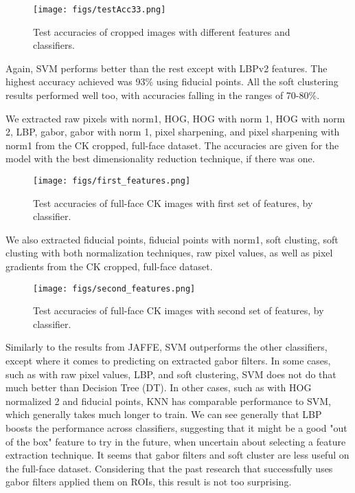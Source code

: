 \documentclass[10pt,twocolumn,letterpaper]{article}
\begin{document}
\begin{figure}[h]
\texttt{[image: figs/testAcc33.png]}
\caption{Test accuracies of cropped images with different features and classifiers.}
\label{fig:testacc3}
\end{figure}

Again, SVM performs better than the rest except with LBPv2 features. The highest accuracy achieved was 93\% using fiducial points. All the soft clustering results performed well too, with accuracies falling in the ranges of 70-80\%.

We extracted raw pixels with norm1, HOG, HOG with norm 1, HOG with norm 2, LBP, gabor, gabor with norm 1, pixel sharpening, and pixel sharpening with norm1 from the CK cropped, full-face dataset. The accuracies are given for the model with the best dimensionality reduction technique, if there was one.

\begin{figure}[h]
\texttt{[image: figs/first\_features.png]}
\caption{Test accuracies of full-face CK images with first set of features, by classifier.}
\label{fig:testck1}
\end{figure}

We also extracted fiducial points, fiducial points with norm1, soft clusting, soft clusting with both normalization techniques, raw pixel values, as well as pixel gradients from the CK cropped, full-face dataset.

\begin{figure}[h]
\texttt{[image: figs/second\_features.png]}
\caption{Test accuracies of full-face CK images with second set of features, by classifier.}
\label{fig:testck2}
\end{figure}

Similarly to the results from JAFFE, SVM outperforms the other classifiers, except where it comes to predicting on extracted gabor filters. In some cases, such as with raw pixel values, LBP, and soft clustering, SVM does not do that much better than Decision Tree (DT). In other cases, such as with HOG normalized 2 and fiducial points, KNN has comparable performance to SVM, which generally takes much longer to train. We can see generally that LBP boosts the performance across classifiers, suggesting that it might be a good "out of the box" feature to try in the future, when uncertain about selecting a feature extraction technique. It seems that gabor filters and soft cluster are less useful on the full-face dataset. Considering that the past research that successfully uses gabor filters applied them on ROIs, this result is not too surprising.
\end{document}
